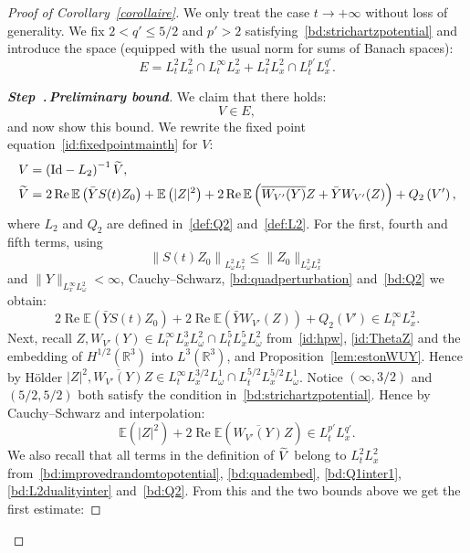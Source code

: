 \documentclass[10pt]{amsart}
\theoremstyle{definition}\newtheorem{defi}[theo]{Definition}\newtheorem{rema}[theo]{Remark}\newtheorem{exam}[theo]{Example}\newtheorem{exem}[theo]{Example}\newtheorem{nota}[theo]{Notation}
\newcommand{\R}{\mathbb{R}}
\newcommand{\E}{\mathbb{E}}
\DeclareMathOperator{\Rel}{Re}
\newcommand{\Id}{\mathrm{Id}}
\newcounter{stepcount}
\newenvironment{step}[1]{\refstepcounter{stepcount}\begin{proof}[{\bf{Step~\thestepcount}{.\,\emph{#1}}}]}{\let\qed\relax\end{proof}}
\let\oldtilde\tilde
\renewcommand*{\tilde}[1]{\mathchoice{\widetilde{#1}}{\widetilde{#1}}{\oldtilde{#1}}{\oldtilde{#1}}}
\begin{document}
\vspace{6pt}
\begin{proof}[Proof of Corollary~\ref{corollaire}]
We only treat the case $t\rightarrow +\infty$ without loss of generality. We fix $2<q'\leq 5/2$ and $p'>2$ satisfying~\eqref{bd:strichartzpotential} and introduce the space (equipped with the usual norm for sums of Banach spaces):
\begin{equation} \label{id:defE}
E=L^2_tL^2_x\cap L^{\infty}_tL^2_x+ L^2_tL^2_x\cap L^{p'}_tL^{q'}_x.
\end{equation}

\setcounter{stepcount}{0}
\begin{step}{{Preliminary bound}}\label{proofcoro1.2step1}
We claim that there holds:
\begin{equation} \label{bd:VinE}
V\in E,
\end{equation}
and now show this bound. We rewrite the fixed point equation~\eqref{id:fixedpointmainth} for $V$:
\begin{align*}
V &=\left(\Id-L_2\right)^{-1}\tilde V, \\
 \tilde V &=2\Rel\E\left(\bar Y S(t) Z_0\right)+\E\left(|Z|^2\right) +2 \Rel \E\left(\overline{W_{V'}(Y)} Z + \bar Y W_{V'}(Z)\right) + Q_2\left(V'\right),
\end{align*}
where $L_2$ and $Q_2$ are defined in~\eqref{def:Q2} and~\eqref{def:L2}. For the first, fourth and fifth terms, using
\[
\left\|S(t)Z_0\right\|_{L^2_\omega L^2_x}\leq \|Z_0\|_{L^2_\omega L^2_x}
\]
and $\| Y\|_{L^{\infty}_xL^2_\omega}<\infty$, Cauchy--Schwarz, \eqref{bd:quadperturbation} and~\eqref{bd:Q2} we obtain:
\[
2\Rel\E\left(\bar Y S(t) Z_0\right)+2 \Rel \E \left(\bar Y W_{V'}(Z)\right) + Q_2\left(V'\right)\in L^{\infty}_tL^2_x.
\]
Next, recall $Z,W_{V'}(Y)\in L^{\infty}_tL^3_xL^2_\omega\cap L^{5}_tL^5_xL^2_\omega$ from~\eqref{id:hpw}, \eqref{id:ThetaZ} and the embedding of $H^{1/2}(\R^3)$ into $L^{3}(\R^3)$, and Proposition~\ref{lem:estonWUY}. Hence by H\"older $|Z|^2,\overline{W_{V'}(Y)} Z \in L^{\infty}_tL^{3/2}_xL^1_\omega\cap L^{5/2}_tL^{5/2}_xL^1_\omega$. Notice $(\infty,3/2)$ and $(5/2,5/2)$ both satisfy the condition in~\eqref{bd:strichartzpotential}. Hence by Cauchy--Schwarz and interpolation:
\[
\E\left(|Z|^2\right) +2 \Rel \E\left(\overline{W_{V'}(Y)} Z\right) \in L^{p'}_tL^{q'}_x.
\]
We also recall that all terms in the definition of $\tilde V$ belong to $L^2_tL^2_x$ from~\eqref{bd:improvedrandomtopotential}, \eqref{bd:quadembed}, \eqref{bd:Q1inter1}, \eqref{bd:L2dualityinter} and~\eqref{bd:Q2}. From this and the two bounds above we get the first estimate:

\end{step}
\end{proof}
\end{document}
